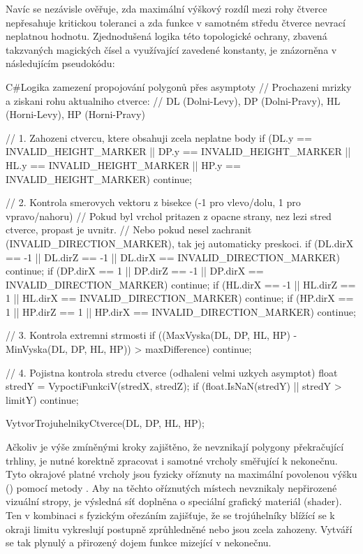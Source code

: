 \documentclass[czech, kiv, sem, he, iso690alph, pdf,viewonly]{fasthesis}
\begin{document}
Navíc se nezávisle ověřuje, zda maximální výškový rozdíl mezi rohy čtverce nepřesahuje kritickou toleranci a zda funkce v samotném středu čtverce nevrací neplatnou hodnotu. 
Zjednodušená logika této topologické ochrany, zbavená takzvaných magických čísel a využívající zavedené konstanty, je znázorněna v následujícím pseudokódu:

\begin{code}{C#}{Logika zamezení propojování polygonů přes asymptoty\label{lst:triangulation}}
// Prochazeni mrizky a ziskani rohu aktualniho ctverce:
// DL (Dolni-Levy), DP (Dolni-Pravy), HL (Horni-Levy), HP (Horni-Pravy)

// 1. Zahozeni ctvercu, ktere obsahuji zcela neplatne body
if (DL.y == INVALID_HEIGHT_MARKER || DP.y == INVALID_HEIGHT_MARKER || 
    HL.y == INVALID_HEIGHT_MARKER || HP.y == INVALID_HEIGHT_MARKER) continue;

// 2. Kontrola smerovych vektoru z bisekce (-1 pro vlevo/dolu, 1 pro vpravo/nahoru)
// Pokud byl vrchol pritazen z opacne strany, nez lezi stred ctverce, propast je uvnitr.
// Nebo pokud nesel zachranit (INVALID_DIRECTION_MARKER), tak jej automaticky preskoci.
if (DL.dirX == -1 || DL.dirZ == -1 || DL.dirX == INVALID_DIRECTION_MARKER) continue; 
if (DP.dirX ==  1 || DP.dirZ == -1 || DP.dirX == INVALID_DIRECTION_MARKER) continue; 
if (HL.dirX == -1 || HL.dirZ ==  1 || HL.dirX == INVALID_DIRECTION_MARKER) continue; 
if (HP.dirX ==  1 || HP.dirZ ==  1 || HP.dirX == INVALID_DIRECTION_MARKER) continue; 

// 3. Kontrola extremni strmosti 
if ((MaxVyska(DL, DP, HL, HP) - MinVyska(DL, DP, HL, HP)) > maxDifference) continue;

// 4. Pojistna kontrola stredu ctverce (odhaleni velmi uzkych asymptot)
float stredY = VypoctiFunkciV(stredX, stredZ);
if (float.IsNaN(stredY) || stredY > limitY) continue;

VytvorTrojuhelnikyCtverce(DL, DP, HL, HP);
\end{code}

Ačkoliv je výše zmíněnými kroky zajištěno, že nevznikají polygony překračující trhliny, je nutné korektně zpracovat i samotné vrcholy směřující k nekonečnu. 
Tyto okrajové platné vrcholy jsou fyzicky oříznuty na maximální povolenou výšku () pomocí metody . Aby na těchto oříznutých místech nevznikaly nepřirozené vizuální stropy, 
je výsledná síť doplněna o speciální grafický materiál (shader). Ten v kombinaci s fyzickým ořezáním zajišťuje, že se trojúhelníky blížící se k okraji limitu vykreslují postupně zprůhledněné nebo jsou zcela zahozeny. Vytváří se tak plynulý a přirozený dojem funkce mizející v nekonečnu.
\end{document}
